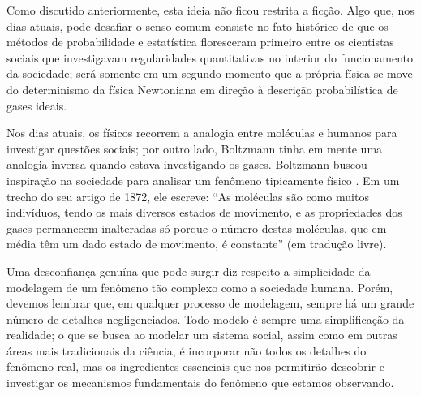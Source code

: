 Como discutido anteriormente, esta ideia não ficou restrita a ficção. Algo que, nos dias atuais, pode desafiar o senso comum consiste no fato histórico de que os métodos de probabilidade e estatística floresceram primeiro entre os cientistas sociais que investigavam regularidades quantitativas no interior do funcionamento da sociedade; será somente em um segundo momento que a própria física se move do determinismo da física Newtoniana em direção à descrição probabilística de gases ideais.



Nos dias atuais, os físicos recorrem a analogia entre moléculas e humanos para investigar questões sociais; por outro lado, Boltzmann tinha em mente uma analogia inversa quando estava investigando os gases. Boltzmann  buscou inspiração na sociedade para analisar um fenômeno tipicamente físico \cite{parthum}. Em um trecho do seu artigo de 1872, ele escreve:   ``As moléculas são como muitos indivíduos, tendo os mais diversos estados de movimento, e as propriedades dos gases permanecem inalteradas só porque o número destas moléculas, que em média têm um dado estado de movimento, é constante\cite{boltzmann1872_translation}'' (em tradução livre).

Uma desconfiança genuína que pode surgir diz respeito a simplicidade da modelagem de um fenômeno tão complexo como a sociedade humana. Porém, devemos lembrar que, em qualquer processo de modelagem, sempre há um grande número de detalhes negligenciados. Todo modelo é sempre  uma simplificação da realidade; o que se busca ao modelar um sistema social, assim como em outras áreas mais tradicionais da ciência, é incorporar não todos os detalhes do  fenômeno real, mas os ingredientes essenciais que nos permitirão descobrir e investigar os mecanismos fundamentais do fenômeno que estamos observando. 


